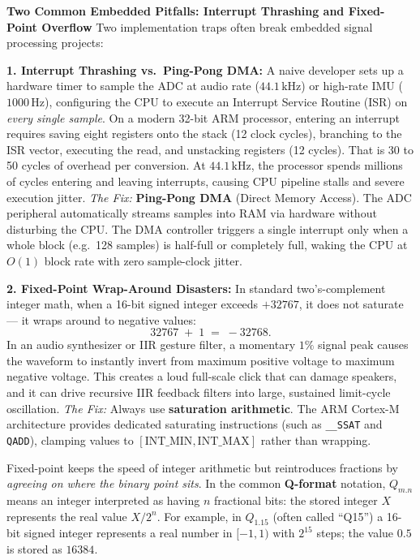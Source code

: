\begin{trapbox}
\textbf{Two Common Embedded Pitfalls: Interrupt Thrashing and Fixed-Point Overflow}
Two implementation traps often break embedded signal processing projects:

\textbf{1. Interrupt Thrashing vs.\ Ping-Pong DMA:}
A naive developer sets up a hardware timer to sample the ADC at audio rate ($44.1\,\text{kHz}$) or high-rate IMU ($1000\,\text{Hz}$), configuring the CPU to execute an Interrupt Service Routine (ISR) on \emph{every single sample}. 
On a modern 32-bit ARM processor, entering an interrupt requires saving eight registers onto the stack (12 clock cycles), branching to the ISR vector, executing the read, and unstacking registers (12 cycles). That is 30 to 50 cycles of overhead per conversion. At $44.1\,\text{kHz}$, the processor spends millions of cycles entering and leaving interrupts, causing CPU pipeline stalls and severe execution jitter.
\emph{The Fix:} \textbf{Ping-Pong DMA} (Direct Memory Access). The ADC peripheral automatically streams samples into RAM via hardware without disturbing the CPU. The DMA controller triggers a single interrupt only when a whole block (e.g.\ 128 samples) is half-full or completely full, waking the CPU at $O(1)$ block rate with zero sample-clock jitter.

\textbf{2. Fixed-Point Wrap-Around Disasters:}
In standard two's-complement integer math, when a 16-bit signed integer exceeds $+32767$, it does not saturate --- it wraps around to negative values:
\[
  32767 \;+\; 1 \;=\; -32768.
\]
In an audio synthesizer or IIR gesture filter, a momentary $1\%$ signal peak causes the waveform to instantly invert from maximum positive voltage to maximum negative voltage. This creates a loud full-scale click that can damage speakers, and it can drive recursive IIR feedback filters into large, sustained limit-cycle oscillation.
\emph{The Fix:} Always use \textbf{saturation arithmetic}. The ARM Cortex-M architecture provides dedicated saturating instructions (such as \texttt{\_\_SSAT} and \texttt{QADD}), clamping values to $[\text{INT\_MIN}, \text{INT\_MAX}]$ rather than wrapping.
\end{trapbox}

Fixed-point keeps the speed of integer arithmetic but reintroduces fractions by \emph{agreeing on
where the binary point sits}. In the common \textbf{Q-format} notation, $Q_{m.n}$ means an integer
interpreted as having $n$ fractional bits: the stored integer $X$ represents the real value
$X / 2^{n}$. For example, in $Q_{1.15}$ (often called ``Q15'') a 16-bit signed integer represents a
real number in $[-1, 1)$ with $2^{15}$ steps; the value $0.5$ is stored as $16384$.


